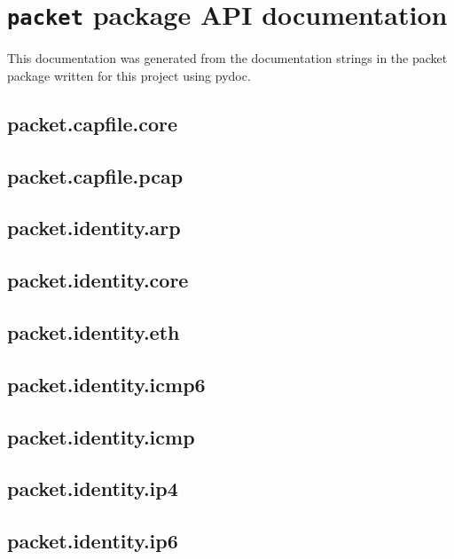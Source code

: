 \documentclass[10pt,a4paper,notitlepage]{report}
\begin{document}
\section{\texttt{packet} package API documentation}
This documentation was generated from the documentation strings in the packet package written for this project using pydoc.
\label{sec:apidoc}
{
\fontsize{7pt}{1em}
\setlength{\parskip}{0.0em}
\subsection{packet.capfile.core}
\subsection{packet.capfile.pcap}

\subsection{packet.identity.arp}
\subsection{packet.identity.core}
\subsection{packet.identity.eth}
\subsection{packet.identity.icmp6}
\subsection{packet.identity.icmp}
\subsection{packet.identity.ip4}
\subsection{packet.identity.ip6}
}
\end{document}
